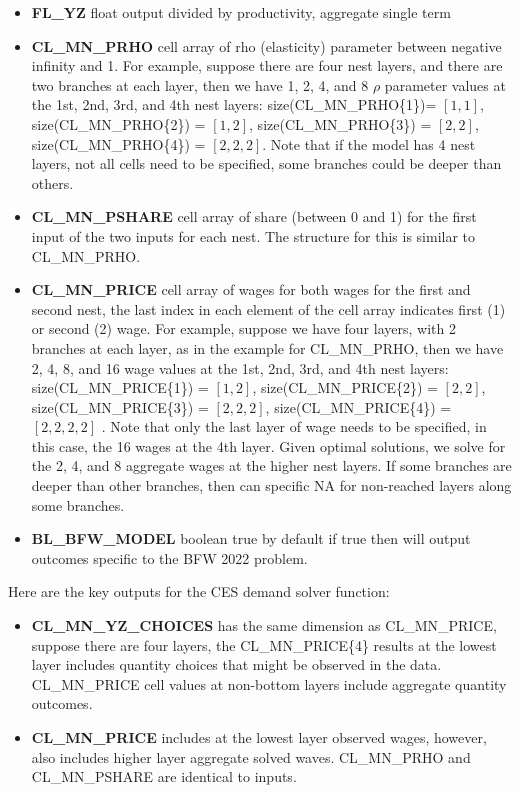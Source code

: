 \documentclass[
]{book}
\begin{document}
\begin{itemize}
\item
  \textbf{FL\_YZ} float output divided by productivity, aggregate single
  term
\item
  \textbf{CL\_MN\_PRHO} cell array of rho (elasticity) parameter between
  negative infinity and 1. For example, suppose there are four nest
  layers, and there are two branches at each layer, then we have 1, 2,
  4, and 8 \(\rho\) parameter values at the 1st, 2nd, 3rd, and 4th nest
  layers: size(CL\_MN\_PRHO\{1\})= \(\left\lbrack 1,1\right\rbrack\),
  size(CL\_MN\_PRHO\{2\}) = \(\left\lbrack 1,2\right\rbrack\),
  size(CL\_MN\_PRHO\{3\}) = \(\left\lbrack 2,2\right\rbrack\),
  size(CL\_MN\_PRHO\{4\}) = \(\left\lbrack 2,2,2\right\rbrack\). Note that
  if the model has 4 nest layers, not all cells need to be specified,
  some branches could be deeper than others.
\item
  \textbf{CL\_MN\_PSHARE} cell array of share (between 0 and 1) for the first
  input of the two inputs for each nest. The structure for this is
  similar to CL\_MN\_PRHO.
\item
  \textbf{CL\_MN\_PRICE} cell array of wages for both wages for the first and
  second nest, the last index in each element of the cell array
  indicates first (1) or second (2) wage. For example, suppose we have
  four layers, with 2 branches at each layer, as in the example for
  CL\_MN\_PRHO, then we have 2, 4, 8, and 16 wage values at the 1st,
  2nd, 3rd, and 4th nest layers: size(CL\_MN\_PRICE\{1\}) =
  \(\left\lbrack 1,2\right\rbrack\), size(CL\_MN\_PRICE\{2\}) =
  \(\left\lbrack 2,2\right\rbrack\), size(CL\_MN\_PRICE\{3\}) =
  \(\left\lbrack 2,2,2\right\rbrack\), size(CL\_MN\_PRICE\{4\}) =
  \(\left\lbrack 2,2,2,2\right\rbrack\) . Note that only the last layer
  of wage needs to be specified, in this case, the 16 wages at the 4th
  layer. Given optimal solutions, we solve for the 2, 4, and 8
  aggregate wages at the higher nest layers. If some branches are
  deeper than other branches, then can specific NA for non-reached
  layers along some branches.
\item
  \textbf{BL\_BFW\_MODEL} boolean true by default if true then will output
  outcomes specific to the BFW 2022 problem.
\end{itemize}

Here are the key outputs for the CES demand solver function:

\begin{itemize}
\item
  \textbf{CL\_MN\_YZ\_CHOICES} has the same dimension as CL\_MN\_PRICE, suppose
  there are four layers, the CL\_MN\_PRICE\{4\} results at the lowest
  layer includes quantity choices that might be observed in the data.
  CL\_MN\_PRICE cell values at non-bottom layers include aggregate
  quantity outcomes.
\item
  \textbf{CL\_MN\_PRICE} includes at the lowest layer observed wages,
  however, also includes higher layer aggregate solved waves.
  CL\_MN\_PRHO and CL\_MN\_PSHARE are identical to inputs.
\end{itemize}
\end{document}
